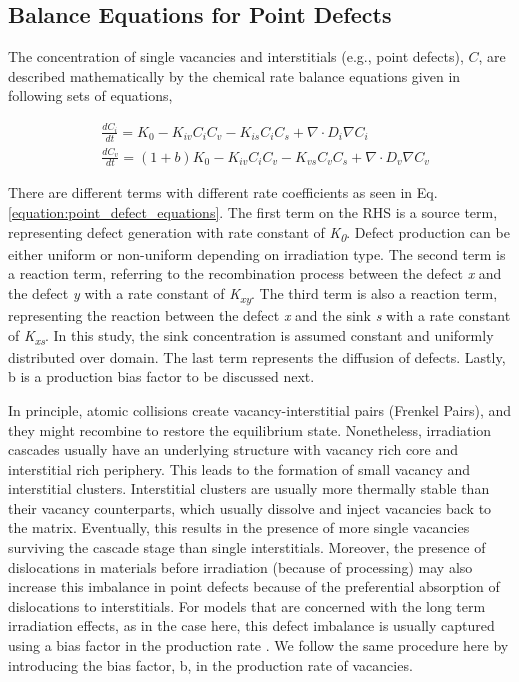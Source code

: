 \documentclass[utf8]{frontiersSCNS} %
\begin{document}

\subsection{Balance Equations for Point Defects}
 The concentration of single vacancies and interstitials (e.g., point defects), $C$, are described mathematically by the chemical rate balance equations given in following sets of equations,

\begin{equation}
  \begin{aligned}
    &\frac{dC_i}{dt} = K_0 - K_{iv}C_iC_v - K_{is}C_iC_s + \nabla\cdot D_i\nabla C_i\\
    &\frac{dC_v}{dt} = (1+b)K_0 - K_{iv}C_iC_v - K_{vs}C_vC_s + \nabla\cdot D_v\nabla C_v
  \end{aligned}
  \label{equation:point_defect_equations}
\end{equation}

    There are different terms with different rate coefficients as seen in Eq. \ref{equation:point_defect_equations}. The first term on the RHS is a source term, representing defect generation with rate constant of \textit{K\textsubscript{0}}. Defect production can be either uniform or non-uniform depending on irradiation type. The second term is a reaction term, referring to the recombination process between the defect \textit{x} and the defect \textit{y} with a rate constant of \textit{K\textsubscript{xy}}. The third term is also a reaction term, representing the reaction between the defect \textit{x} and the sink \textit{s} with a rate constant of \textit{K\textsubscript{xs}}. In this study, the sink concentration is assumed constant and uniformly distributed over domain. The last term represents the  diffusion of defects\citep{motta2017,was2017}. Lastly, b is a production bias factor to be discussed next.
    
    In principle, atomic collisions create vacancy-interstitial pairs (Frenkel Pairs), and they might recombine to restore the equilibrium state. Nonetheless, irradiation cascades usually have an underlying structure with vacancy rich core and interstitial rich periphery. This leads to the formation of small vacancy and interstitial clusters. Interstitial clusters are usually more thermally stable than their vacancy counterparts, which usually dissolve and inject vacancies back to the matrix. Eventually, this results in the presence of more single vacancies surviving the cascade stage than single interstitials. Moreover, the presence of dislocations in materials before irradiation (because of processing) may also increase this imbalance in point defects because of the preferential absorption of dislocations to interstitials. For models that are concerned with the long term irradiation effects, as in the case here, this defect imbalance is usually captured using a bias factor in the production rate \citep{motta2017,was2017}. We follow the same procedure here by introducing the bias factor, b, in the production rate of vacancies.
    
\end{document}
